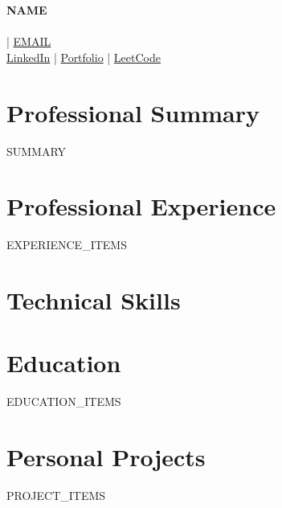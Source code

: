 \documentclass[11pt,a4paper]{article}
\begin{document}
\begin{center}
    \textbf{\large {{NAME}}} \\
    \vspace{6pt}
     \\
     | \href{mailto:{{EMAIL}}}{{{EMAIL}}} \\
    \normalfont \href{{{LINKEDIN}}}{LinkedIn} | \href{{{PORTFOLIO}}}{Portfolio} | \href{{{LEETCODE}}}{LeetCode}
\end{center}

\section{Professional Summary}
{{SUMMARY}}

\section{Professional Experience}
\begin{itemize}[leftmargin=0.15in, label={}]
{{EXPERIENCE_ITEMS}}
\end{itemize}


\section{Technical Skills}
\begin{itemize}[leftmargin=0.15in, label={}]
\end{itemize}



\section{Education}
\begin{itemize}[leftmargin=0.15in, label={}]
{{EDUCATION_ITEMS}}
\end{itemize}

\section{Personal Projects}
\begin{itemize}[leftmargin=0.15in, label={}]
{{PROJECT_ITEMS}}
\end{itemize}
\end{document}
